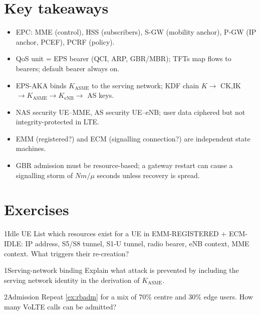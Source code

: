 \documentclass[11pt,a4paper]{article}
\begin{document}
\section{Key takeaways}
\begin{takeawaybox}
\begin{itemize}
  \item EPC: MME (control), HSS (subscribers), S-GW (mobility anchor), P-GW (IP anchor, PCEF), PCRF (policy).
  \item QoS unit = EPS bearer (QCI, ARP, GBR/MBR); TFTs map flows to bearers; default bearer always on.
  \item EPS-AKA binds $K_{\mathrm{ASME}}$ to the serving network; KDF chain $K\to$ CK,IK $\to K_{\mathrm{ASME}}\to K_{\mathrm{eNB}}\to$ AS keys.
  \item NAS security UE--MME, AS security UE--eNB; user data ciphered but not integrity-protected in LTE.
  \item EMM (registered?) and ECM (signalling connection?) are independent state machines.
  \item GBR admission must be resource-based; a gateway restart can cause a signalling storm of $Nm/\mu$ seconds
        unless recovery is spread.
\end{itemize}
\end{takeawaybox}

\section{Exercises}

\begin{exercisebox}{1}{Idle UE}\label{exr:idle}
List which resources exist for a UE in EMM-REGISTERED + ECM-IDLE: IP address, S5/S8 tunnel, S1-U tunnel,
radio bearer, eNB context, MME context. What triggers their re-creation?
\end{exercisebox}

\begin{exercisebox}{1}{Serving-network binding}\label{exr:binding}
Explain what attack is prevented by including the serving network identity in the derivation of
$K_{\mathrm{ASME}}$.
\end{exercisebox}

\begin{exercisebox}{2}{Admission}\label{exr:rbadm}
Repeat \cref{ex:rbadm} for a mix of 70\% centre and 30\% edge users. How many VoLTE calls can be admitted?
\end{exercisebox}
\end{document}
